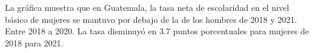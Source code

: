 La gráfica muestra que en Guatemala, la tasa neta de escolaridad en el nivel básico de mujeres se mantuvo por debajo de la de los hombres de 2018 y 2021. Entre 2018 a 2020. La tasa disminuyó en 3.7 puntos porcentuales para mujeres de 2018 para 2021.